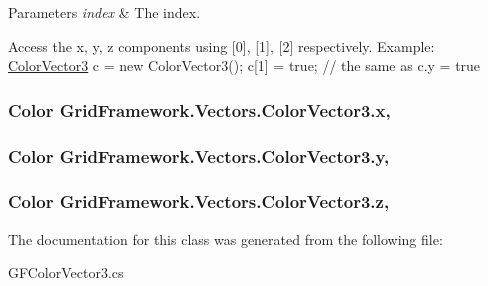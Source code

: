 \begin{DoxyParams}{Parameters}
{\em index} & The index.\\
\hline
\end{DoxyParams}
Access the x, y, z components using \mbox{[}0\mbox{]}, \mbox{[}1\mbox{]}, \mbox{[}2\mbox{]} respectively. Example\+: {\ttfamily  \hyperlink{class_grid_framework_1_1_vectors_1_1_color_vector3}{Color\+Vector3} c = new Color\+Vector3(); c\mbox{[}1\mbox{]} = true; // the same as c.\+y = true } \hypertarget{class_grid_framework_1_1_vectors_1_1_color_vector3_a5ea343a66fb2f8f1dc3294761f9a9506_a5ea343a66fb2f8f1dc3294761f9a9506}{
\subsubsection[{x}]{\setlength{\rightskip}{0pt plus 5cm}Color Grid\+Framework.\+Vectors.\+Color\+Vector3.\+x\hspace{0.3cm}{\ttfamily [get]}, {\ttfamily [set]}}}\label{class_grid_framework_1_1_vectors_1_1_color_vector3_a5ea343a66fb2f8f1dc3294761f9a9506_a5ea343a66fb2f8f1dc3294761f9a9506}
\hypertarget{class_grid_framework_1_1_vectors_1_1_color_vector3_a10438170f7d6aa99e0a0bef67edd1339_a10438170f7d6aa99e0a0bef67edd1339}{
\subsubsection[{y}]{\setlength{\rightskip}{0pt plus 5cm}Color Grid\+Framework.\+Vectors.\+Color\+Vector3.\+y\hspace{0.3cm}{\ttfamily [get]}, {\ttfamily [set]}}}\label{class_grid_framework_1_1_vectors_1_1_color_vector3_a10438170f7d6aa99e0a0bef67edd1339_a10438170f7d6aa99e0a0bef67edd1339}
\hypertarget{class_grid_framework_1_1_vectors_1_1_color_vector3_ad2a62e1eb83e3ef54e03c99018b0926a_ad2a62e1eb83e3ef54e03c99018b0926a}{
\subsubsection[{z}]{\setlength{\rightskip}{0pt plus 5cm}Color Grid\+Framework.\+Vectors.\+Color\+Vector3.\+z\hspace{0.3cm}{\ttfamily [get]}, {\ttfamily [set]}}}\label{class_grid_framework_1_1_vectors_1_1_color_vector3_ad2a62e1eb83e3ef54e03c99018b0926a_ad2a62e1eb83e3ef54e03c99018b0926a}


The documentation for this class was generated from the following file\+:\begin{DoxyCompactItemize}
\item 
G\+F\+Color\+Vector3.\+cs\end{DoxyCompactItemize}
